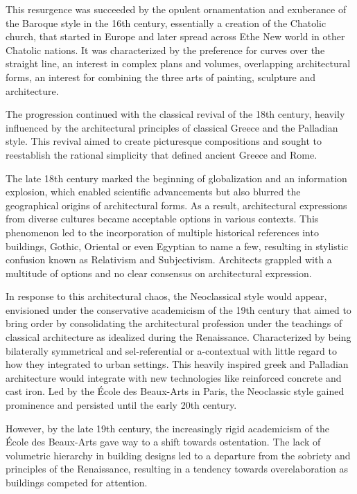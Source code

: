 This resurgence was succeeded by the opulent ornamentation and exuberance of the Baroque style in the 16th century, essentially a creation of the Chatolic church, that started in Europe and later spread across Ethe New world in other Chatolic nations.
It was characterized by the preference for curves over the straight line, an interest in complex plans and volumes, overlapping architectural forms, an interest for combining the three arts of painting, sculpture and architecture\cite{Economakis2023}.

The progression continued with the classical revival of the 18th century, heavily influenced by the architectural principles of classical Greece and the Palladian style.
This revival aimed to create picturesque compositions and sought to reestablish the rational simplicity that defined ancient Greece and Rome\cite{Economakis2023}.

The late 18th century marked the beginning of globalization and an information explosion, which enabled scientific advancements but also blurred the geographical origins of architectural forms.
As a result, architectural expressions from diverse cultures became acceptable options in various contexts.
This phenomenon led to the incorporation of multiple historical references into buildings, Gothic, Oriental or even Egyptian to name a few, resulting in stylistic confusion known as Relativism and Subjectivism.
Architects grappled with a multitude of options and no clear consensus on architectural expression\cite{Economakis2023}.

In response to this architectural chaos, the Neoclassical style would appear, envisioned under the conservative academicism of the 19th century that aimed to bring order by consolidating the architectural profession under the teachings of classical architecture as idealized during the Renaissance.
Characterized by being bilaterally symmetrical and sel-referential or a-contextual with little regard to how they integrated to urban settings.
This heavily inspired greek and Palladian architecture would integrate with new technologies like reinforced concrete and cast iron.
Led by the École des Beaux-Arts in Paris, the Neoclassic style gained prominence and persisted until the early 20th century\cite{Economakis2023}.

However, by the late 19th century, the increasingly rigid academicism of the École des Beaux-Arts gave way to a shift towards ostentation.
The lack of volumetric hierarchy in building designs led to a departure from the sobriety and principles of the Renaissance, resulting in a tendency towards overelaboration as buildings competed for attention\cite{Economakis2023}.

